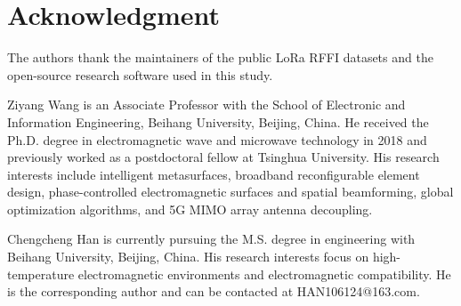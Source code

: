 \documentclass[journal]{IEEEtran}
\begin{document}
\section*{Acknowledgment}
The authors thank the maintainers of the public LoRa RFFI datasets and the open-source research software used in this study.



\begin{IEEEbiography}{Ziyang Wang}
is an Associate Professor with the School of Electronic and Information Engineering, Beihang University, Beijing, China. He received the Ph.D. degree in electromagnetic wave and microwave technology in 2018 and previously worked as a postdoctoral fellow at Tsinghua University. His research interests include intelligent metasurfaces, broadband reconfigurable element design, phase-controlled electromagnetic surfaces and spatial beamforming, global optimization algorithms, and 5G MIMO array antenna decoupling.
\end{IEEEbiography}
\begin{IEEEbiography}{Chengcheng Han}
is currently pursuing the M.S. degree in engineering with Beihang University, Beijing, China. His research interests focus on high-temperature electromagnetic environments and electromagnetic compatibility. He is the corresponding author and can be contacted at HAN106124@163.com.
\end{IEEEbiography}
\end{document}
